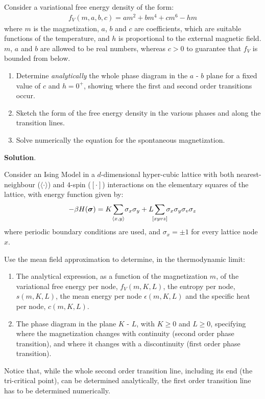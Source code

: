 \documentclass[../../main.tex]{subfiles}
\begin{document}
\begin{exo}\label{exo:phase-diagram}
    Consider a variational free energy density of the form:
    \begin{align*}
        f_V(m,a,b,c) = a m^2 + b m^4 + cm^6 - hm
    \end{align*}
    where $m$ is the magnetization, $a$, $b$ and $c$ are coefficients, which are suitable functions of the temperature, and $h$ is proportional to the external magnetic field. $m$, $a$ and $b$ are allowed to be real numbers, whereas $c > 0$ to guarantee that $f_V$ is bounded from below. 
    \begin{enumerate}
        \item Determine \textit{analytically} the whole phase diagram in the $a$ - $b$ plane for a fixed value of $c$ and $h=0^+$, showing where the first and second order transitions occur.
        \item Sketch the form of the free energy density in the various phases and along the transition lines.
        \item Solve numerically the equation for the spontaneous magnetization.
    \end{enumerate}

    \medskip

    \textbf{Solution}. 
\end{exo}

\begin{exo}
    Consider an Ising Model in a $d$-dimensional hyper-cubic lattice with both nearest-neighbour ($\langle \cdot \rangle$) and $4$-spin ($[\cdot]$) interactions on the elementary squares of the lattice, with energy function given by:
    \begin{align*}
        - \beta H(\bm{\sigma}) = K \sum_{\mathclap{\langle x,y \rangle}} \sigma_x \sigma_y + L \sum_{\mathclap{[xyvz]}} \sigma_x \sigma_y \sigma_v \sigma_z
    \end{align*}
    where periodic boundary conditions are used, and $\sigma_x = \pm 1$ for every lattice node $x$.

    \medskip

    Use the mean field approximation to determine, in the thermodynamic limit:
    \begin{enumerate}
        \item The analytical expression, as a function of the magnetization $m$, of the variational free energy per node, $f_V(m,K,L)$, the entropy per node, $s(m,K,L)$, the mean energy per node $\epsilon(m,K,L)$ and the specific heat per node, $c(m,K,L)$.
        \item The phase diagram in the plane $K$ - $L$, with $K \geq 0$ and $L \geq 0$, specifying where the magnetization changes with continuity (second order phase transition), and where it changes with a discontinuity (first order phase transition).
    \end{enumerate}

    Notice that, while the whole second order transition line, including its end (the tri-critical point), can be determined analytically, the first order transition line has to be determined numerically.
\end{exo}
\end{document}
